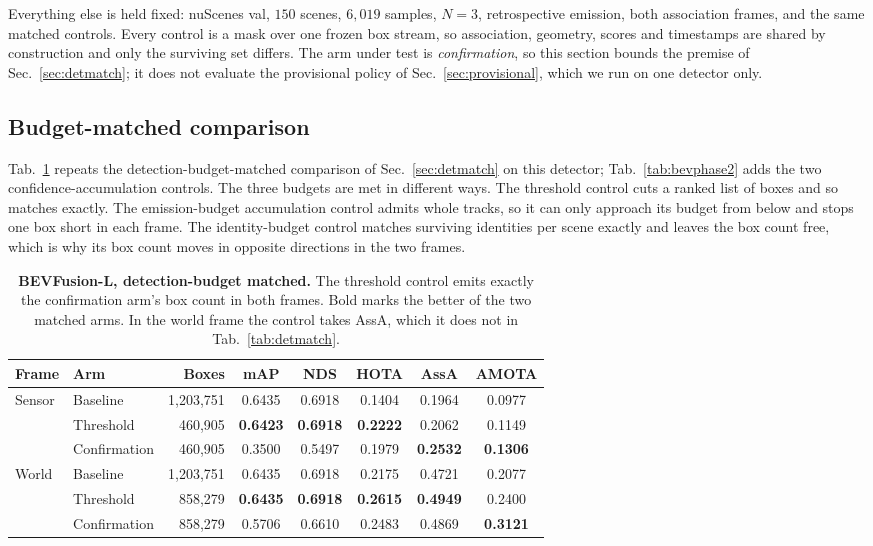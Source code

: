 Everything else is held fixed: nuScenes val, $150$ scenes, $6{,}019$ samples,
$N{=}3$, retrospective emission, both association frames, and the same matched
controls. Every control is a mask over one frozen box stream, so association,
geometry, scores and timestamps are shared by construction and only the
surviving set differs. The arm under test is \emph{confirmation}, so this
section bounds the premise of Sec.~\ref{sec:detmatch}; it does not evaluate the
provisional policy of Sec.~\ref{sec:provisional}, which we run on one detector
only.

\subsection*{Budget-matched comparison}
Tab.~\ref{tab:bevphase1} repeats the detection-budget-matched comparison of
Sec.~\ref{sec:detmatch} on this detector; Tab.~\ref{tab:bevphase2} adds the two
confidence-accumulation controls. The three budgets are met in different ways.
The threshold control cuts a ranked list of boxes and so matches exactly. The
emission-budget accumulation control admits whole tracks, so it can only
approach its budget from below and stops one box short in each frame. The
identity-budget control matches surviving identities per scene exactly and
leaves the box count free, which is why its box count moves in opposite
directions in the two frames.

\begin{table}[t]
\centering\footnotesize
\setlength{\tabcolsep}{6pt}
\begin{tabular}{llrccccc}
\toprule
Frame & Arm & Boxes & mAP & NDS & HOTA & AssA & AMOTA \\
\midrule
\multirow{3}{*}{Sensor}
 & Baseline    & 1{,}203{,}751 & 0.6435 & 0.6918 & 0.1404 & 0.1964 & 0.0977 \\
 & Threshold   &   460{,}905 & \textbf{0.6423} & \textbf{0.6918} & \textbf{0.2222} & 0.2062 & 0.1149 \\
 & Confirmation&   460{,}905 & 0.3500 & 0.5497 & 0.1979 & \textbf{0.2532} & \textbf{0.1306} \\
\midrule
\multirow{3}{*}{World}
 & Baseline    & 1{,}203{,}751 & 0.6435 & 0.6918 & 0.2175 & 0.4721 & 0.2077 \\
 & Threshold   &   858{,}279 & \textbf{0.6435} & \textbf{0.6918} & \textbf{0.2615} & \textbf{0.4949} & 0.2400 \\
 & Confirmation&   858{,}279 & 0.5706 & 0.6610 & 0.2483 & 0.4869 & \textbf{0.3121} \\
\bottomrule
\end{tabular}
\caption{\textbf{BEVFusion-L, detection-budget matched.} The threshold control
emits exactly the confirmation arm's box count in both frames. Bold marks the
better of the two matched arms. In the world frame the control takes AssA,
which it does not in Tab.~\ref{tab:detmatch}.}
\label{tab:bevphase1}
\end{table}

